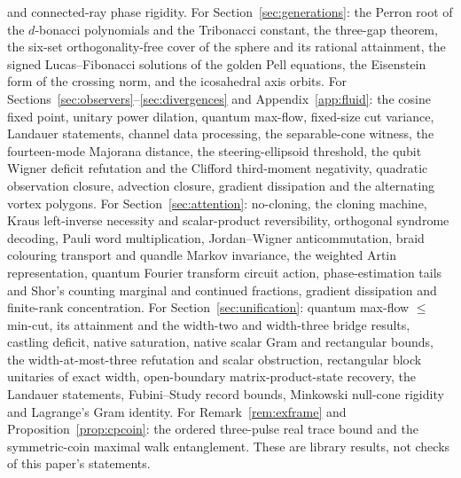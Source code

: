 \documentclass[aps,pra,onecolumn,superscriptaddress,nofootinbib,10pt]{revtex4-2}
\theoremstyle{definition}
\theoremstyle{remark}
\begin{document}
{and connected-ray phase rigidity.  For Section~\ref{sec:generations}: the Perron root of the $d$-bonacci
polynomials and the Tribonacci constant, the three-gap theorem, the six-set orthogonality-free cover of the
sphere and its rational attainment, the signed Lucas--Fibonacci solutions of the golden Pell equations,
the Eisenstein form of the crossing norm, and the icosahedral axis orbits.  For Sections~\ref{sec:observers}--\ref{sec:divergences} and Appendix~\ref{app:fluid}: the cosine fixed point,
unitary power dilation, quantum max-flow, fixed-size cut variance, Landauer statements, channel data
processing, the separable-cone witness, the fourteen-mode Majorana distance, the steering-ellipsoid
threshold, the qubit Wigner deficit refutation and the Clifford third-moment negativity, quadratic
observation closure, advection closure, gradient dissipation and the alternating vortex polygons.  For Section~\ref{sec:attention}: no-cloning, the cloning machine, Kraus
left-inverse necessity and scalar-product reversibility, orthogonal syndrome decoding, Pauli word
multiplication, Jordan--Wigner anticommutation, braid colouring transport and quandle Markov invariance,
the weighted Artin representation, quantum Fourier transform circuit action, phase-estimation tails and
Shor's counting marginal and continued fractions, gradient dissipation and finite-rank concentration.  For
Section~\ref{sec:unification}: quantum max-flow $\le$ min-cut, its attainment and the width-two and width-three
bridge results, castling deficit, native saturation, native scalar Gram and rectangular bounds, the
width-at-most-three refutation and scalar obstruction, rectangular block unitaries of exact width,
open-boundary matrix-product-state recovery, the Landauer statements, Fubini--Study record bounds,
Minkowski null-cone rigidity and Lagrange's Gram identity.  For Remark~\ref{rem:exframe} and
Proposition~\ref{prop:cpcoin}: the ordered three-pulse real trace bound and the symmetric-coin maximal walk
entanglement.  These are library results,
not checks of this paper's statements.\par}
\end{document}
